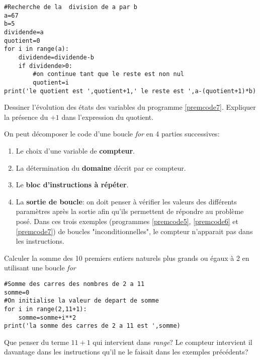 \begin{lstlisting}[frame=lines, float=ht,caption={division euclidienne V2  \textit{for}},label=premcode7]
#Recherche de la  division de a par b
a=67
b=5
dividende=a
quotient=0
for i in range(a):
    dividende=dividende-b
    if dividende>0:
    	#on continue tant que le reste est non nul 
        quotient=i     
print('le quotient est ',quotient+1,' le reste est ',a-(quotient+1)*b)
\end{lstlisting}

\begin{Exercise}[title={Evolution},counter={exo}]
  Dessiner l'évolution des états des variables du programme \ref{premcode7}. Expliquer la présence du $+1$ dans l'expression du quotient.
\end{Exercise}

\begin{defi}
On peut décomposer le code d'une boucle \textit{for} en 4 parties successives:
\begin{enumerate}
    \item Le choix d'une variable de \textbf{compteur}. 
	\item La détermination du \textbf{domaine} décrit par ce compteur.
	\item Le \textbf{bloc d'instructions à répéter}.
	\item La \textbf{sortie de boucle}: on doit penser à vérifier les valeurs des différents paramètres après la sortie afin qu'ils permettent de répondre au problème posé.
Dans ces trois exemples (programmes \ref{premcode5}, \ref{premcode6} et \ref{premcode7}) de boucles "inconditionnelles", le compteur n'apparait pas dans les instructions.
\end{enumerate}
\end{defi}

\begin{Exercise}[title={Somme de termes},counter={exo}]
  Calculer la somme des 10 premiers entiers naturels plus grands ou égaux à 2 en utilisant une boucle \textit{for}
\end{Exercise}

\begin{lstlisting}[frame=lines, float=ht,caption={Somme de carrés  \textit{while}},label=premcode8]
#Somme des carres des nombres de 2 a 11
somme=0
#On initialise la valeur de depart de somme
for i in range(2,11+1):
    somme=somme+i**2
print('la somme des carres de 2 a 11 est ',somme)
\end{lstlisting}

Que penser du terme $11+1$ qui intervient dans \textit{range}?
Le compteur intervient il davantage dans les instructions qu'il ne le faisait dans les exemples précédents?

